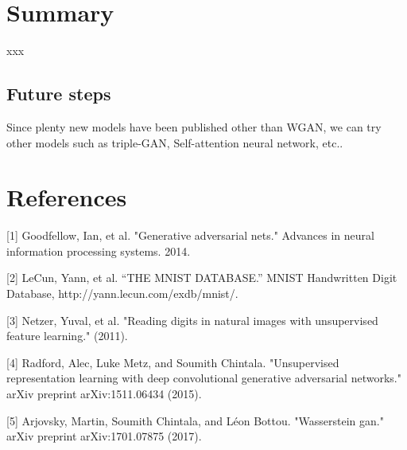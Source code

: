 \documentclass{article}
\begin{document}
\section{Summary}

xxx

\subsection{Future steps}

Since plenty new models have been published other than WGAN, we can try other models such as triple-GAN, Self-attention neural network, etc..

\clearpage
\section*{References}

[1] Goodfellow, Ian, et al. "Generative adversarial nets." Advances in neural information processing systems. 2014.

[2] LeCun, Yann, et al. “THE MNIST DATABASE.” MNIST Handwritten Digit Database, http://yann.lecun.com/exdb/mnist/.

[3] Netzer, Yuval, et al. "Reading digits in natural images with unsupervised feature learning." (2011).

[4] Radford, Alec, Luke Metz, and Soumith Chintala. "Unsupervised representation learning with deep convolutional generative adversarial networks." arXiv preprint arXiv:1511.06434 (2015).

[5] Arjovsky, Martin, Soumith Chintala, and Léon Bottou. "Wasserstein gan." arXiv preprint arXiv:1701.07875 (2017).
\end{document}
